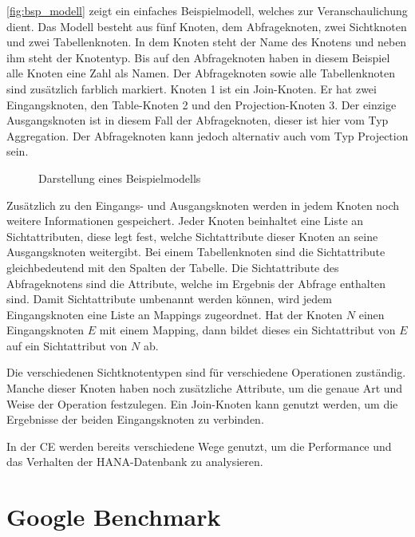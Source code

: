 \autoref{fig:bsp_modell} zeigt ein einfaches Beispielmodell, welches zur
Veranschaulichung dient. Das Modell besteht aus fünf Knoten, dem Abfrageknoten,
zwei Sichtknoten und zwei Tabellenknoten. In dem Knoten steht der Name des
Knotens und neben ihm steht der Knotentyp. Bis auf den Abfrageknoten haben in
diesem Beispiel alle Knoten eine Zahl als Namen. Der Abfrageknoten sowie alle
Tabellenknoten sind zusätzlich farblich markiert. Knoten 1 ist ein
\foreignlanguage{english}{Join}-Knoten. Er hat zwei Eingangsknoten, den
\foreignlanguage{english}{Table}-Knoten 2 und den
\foreignlanguage{english}{Projection}-Knoten 3. Der einzige Ausgangsknoten ist
in diesem Fall der Abfrageknoten, dieser ist hier vom Typ
\foreignlanguage{english}{Aggregation}. Der Abfrageknoten kann jedoch
alternativ auch vom Typ \foreignlanguage{english}{Projection} sein.

\begin{figure}
    \begin{center}
        
    \end{center}
    \caption{Darstellung eines Beispielmodells}\label{fig:bsp_modell}
\end{figure}

Zusätzlich zu den Eingangs- und Ausgangsknoten werden in jedem Knoten
noch weitere Informationen gespeichert. Jeder Knoten beinhaltet
eine Liste an Sichtattributen, diese legt fest, welche Sichtattribute dieser
Knoten an seine Ausgangsknoten weitergibt. Bei einem Tabellenknoten sind die
Sichtattribute gleichbedeutend mit den Spalten der Tabelle. Die Sichtattribute
des Abfrageknotens sind die Attribute, welche im Ergebnis der Abfrage enthalten
sind. Damit Sichtattribute umbenannt werden können, wird jedem Eingangsknoten
eine Liste an Mappings zugeordnet. Hat der Knoten $N$ einen Eingangsknoten $E$
mit einem Mapping, dann bildet dieses ein Sichtattribut von $E$ auf ein
Sichtattribut von $N$ ab.

Die verschiedenen Sichtknotentypen sind für verschiedene Operationen zuständig.
Manche dieser Knoten haben noch zusätzliche Attribute, um die genaue Art und
Weise der Operation festzulegen.
Ein \foreignlanguage{english}{Join}-Knoten kann genutzt werden, um die
Ergebnisse der beiden Eingangsknoten zu verbinden. 

In der \ac{CE} werden bereits verschiedene Wege genutzt, um die Performance und
das Verhalten der HANA-Datenbank zu analysieren. 
\section{Google Benchmark}
\label{sec:google_benchmark}


